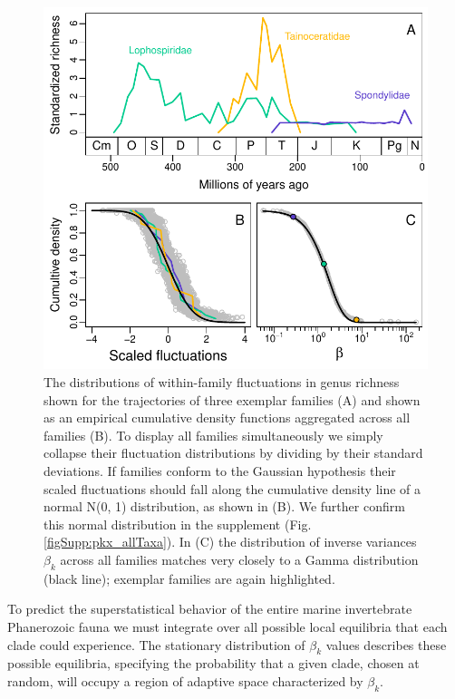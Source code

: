 \documentclass[12pt]{article}
\begin{document}
\begin{figure}[!h]
  \centering
  \includegraphics[scale=0.9]{../../fig_pkx-fbeta.pdf}
  \caption[Variability in trajectories of within-family fluctuations
  in genus richness]{The distributions of within-family fluctuations
    in genus richness shown for the trajectories of three exemplar
    families (A) and shown as an empirical cumulative density
    functions aggregated across all families (B). To display all
    families simultaneously we simply collapse their fluctuation
    distributions by dividing by their standard deviations. If
    families conform to the Gaussian hypothesis their scaled
    fluctuations should fall along the cumulative density line of a
    normal N(0, 1) distribution, as shown in (B). We further confirm
    this normal distribution in the supplement
    (Fig. \ref{figSupp:pkx_allTaxa}). In (C) the distribution of
    inverse variances $\beta_k$ across all families matches very
    closely to a Gamma distribution (black line); exemplar families
    are again highlighted.}
  \label{fig:pk_f}
\end{figure}


To predict the superstatistical behavior of the entire marine
invertebrate Phanerozoic fauna we must integrate over all possible
local equilibria that each clade could experience. The stationary
distribution of $\beta_k$ values describes these possible equilibria,
specifying the probability that a given clade, chosen at random, will
occupy a region of adaptive space characterized by $\beta_k$.
\end{document}
